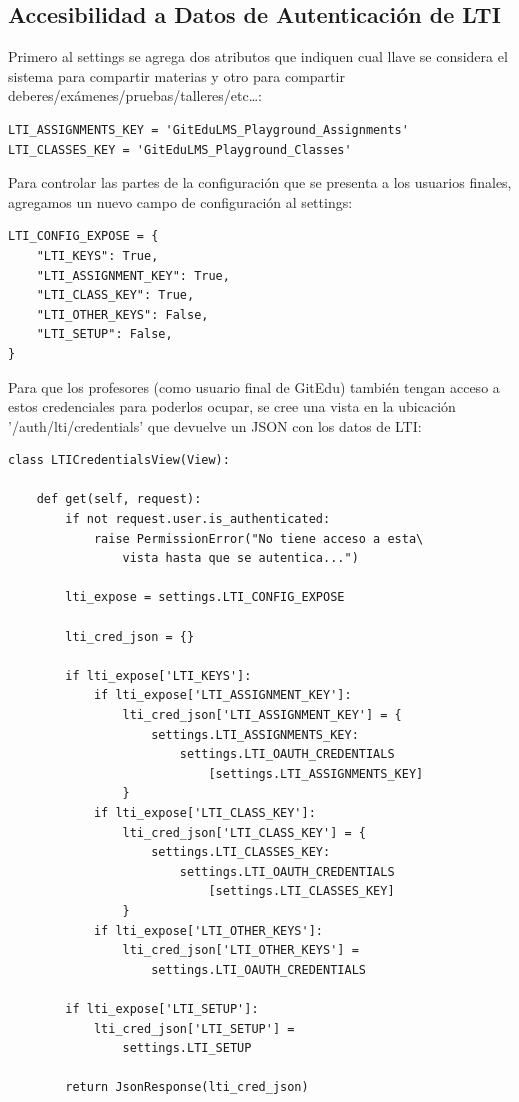 \subsection{Accesibilidad a Datos de Autenticación de LTI}
Primero al settings se agrega dos atributos que indiquen cual llave se considera el sistema para compartir materias y otro para compartir deberes/exámenes/pruebas/talleres/etc\ldots{}:
\lstset{language=Python}
\begin{lstlisting}
LTI_ASSIGNMENTS_KEY = 'GitEduLMS_Playground_Assignments'
LTI_CLASSES_KEY = 'GitEduLMS_Playground_Classes'
\end{lstlisting}
\lstset{language=Bash}

Para controlar las partes de la configuración que se presenta a los usuarios finales, agregamos un nuevo campo de configuración al settings:
\lstset{language=Python}
\begin{lstlisting}
LTI_CONFIG_EXPOSE = {
    "LTI_KEYS": True,
    "LTI_ASSIGNMENT_KEY": True,
    "LTI_CLASS_KEY": True,
    "LTI_OTHER_KEYS": False,
    "LTI_SETUP": False,
}
\end{lstlisting}
\lstset{language=Bash}

Para que los profesores (como usuario final de GitEdu) también tengan acceso a estos credenciales para poderlos ocupar, se cree una vista en la ubicación '/auth/lti/credentials' que devuelve un JSON con los datos de LTI:
\lstset{language=Python}
\begin{lstlisting}
class LTICredentialsView(View):

    def get(self, request):
        if not request.user.is_authenticated:
            raise PermissionError("No tiene acceso a esta\
                vista hasta que se autentica...")

        lti_expose = settings.LTI_CONFIG_EXPOSE

        lti_cred_json = {}

        if lti_expose['LTI_KEYS']:
            if lti_expose['LTI_ASSIGNMENT_KEY']:
                lti_cred_json['LTI_ASSIGNMENT_KEY'] = {
                    settings.LTI_ASSIGNMENTS_KEY: 
                        settings.LTI_OAUTH_CREDENTIALS
                            [settings.LTI_ASSIGNMENTS_KEY]
                }
            if lti_expose['LTI_CLASS_KEY']:
                lti_cred_json['LTI_CLASS_KEY'] = {
                    settings.LTI_CLASSES_KEY:
                        settings.LTI_OAUTH_CREDENTIALS
                            [settings.LTI_CLASSES_KEY]
                }
            if lti_expose['LTI_OTHER_KEYS']:
                lti_cred_json['LTI_OTHER_KEYS'] =
                    settings.LTI_OAUTH_CREDENTIALS

        if lti_expose['LTI_SETUP']:
            lti_cred_json['LTI_SETUP'] =
                settings.LTI_SETUP

        return JsonResponse(lti_cred_json)
\end{lstlisting}
\lstset{language=Bash}

